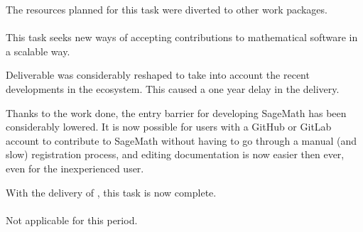   The resources planned for this task were diverted to other work
  packages.
  
  \paragraph{}
  This task seeks new ways of accepting contributions to mathematical
  software in a scalable way.

  Deliverable  was
  considerably reshaped to take into account the recent developments
  in the ecosystem. This caused a one year delay in the delivery.

  Thanks to the work done, the entry barrier for developing SageMath
  has been considerably lowered. It is now possible for users with a
  GitHub or GitLab account to contribute to SageMath without having to
  go through a manual (and slow) registration process, and editing
  documentation is now easier then ever, even for the inexperienced
  user.

  With the delivery of
  , this task is now
  complete.

  \paragraph{}
  \label{component-architecture@oommf-python-interface}
  Not applicable for this period.

  
